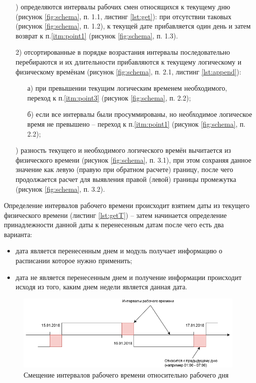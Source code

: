 \begin{enumerate}
	\item[\mylabel{itm:point1}{1})] определяются интервалы рабочих смен относящихся к текущему дню (рисунок \ref{fig:schema}, п. 1.1, листинг \ref{lst:get}): при отсутствии таковых (рисунок \ref{fig:schema}, п. 1.2), к текущей дате прибавляется один день и затем возврат к п.\ref{itm:point1} (рисунок \ref{fig:schema}, п. 1.3).
	\item[2)] отсортированные в порядке возрастания интервалы последовательно перебираются и их длительности прибавляются к текущему логическому и физическому времёнам (рисунок \ref{fig:schema}, п. 2.1, листинг \ref{lst:append}):
	      \begin{enumerate}
		      \item[а)] при превышении текущим логическим временем необходимого, переход к п.\ref{itm:point3} (рисунок \ref{fig:schema}, п. 2.2);
		      \item[б)] если все интервалы были просуммированы, но необходимое логическое время не превышено -- переход к п.\ref{itm:point1} (рисунок \ref{fig:schema}, п. 2.2);
	      \end{enumerate}
	\item[\mylabel{itm:point3}{3})] разность текущего и необходимого логического времён вычитается из физического времени (рисунок \ref{fig:schema}, п. 3.1), при этом сохраняя данное значение как левую (правую при обратном расчете) границу, после чего продолжается расчет для выявления правой (левой) границы промежутка (рисунок \ref{fig:schema}, п. 3.2).
\end{enumerate}

\indent Определение интервалов рабочего времени происходит взятием даты из текущего физического времени (листинг \ref{lst:getT}) -- затем начинается определение принадлежности данной даты к перенесенным датам после чего есть два варианта:

\begin{itemize}
	\item дата является перенесенным днем и модуль получает информацию о расписании которое нужно применить;
	\item дата не является перенесенным днем и получение информации происходит исходя из того, каким днем недели является данная дата.
\end{itemize}

\begin{figure}[h!]
	\centering
	\includegraphics[width=\linewidth]{pics/scheduleIntervals.png}
	\caption{Смещение интервалов рабочего времени относительно рабочего дня}
	\label{fig:intervals}
\end{figure}

